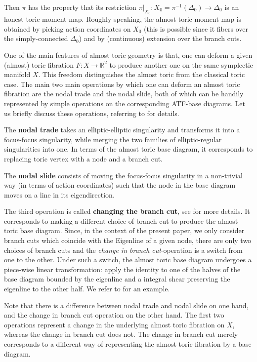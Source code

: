 \documentclass[12pt,a4paper,draft]{scrartcl}
\begin{document}
Then $\pi$ has the property that its restriction $\pi\vert_{X_0} \colon X_0 = \pi^{-1}(\Delta_0) \rightarrow \Delta_0$ is an honest toric moment map.
Roughly speaking, the almost toric moment map is obtained by picking action coordinates on $X_0$ (this is possible since it fibers over the simply-connected $\Delta_0$) and by (continuous) extension over the branch cuts.

One of the main features of almost toric geometry is that, one can deform a given (almost) toric fibration $F \colon X \rightarrow \mathbb{R}^2$ to produce another one on the same symplectic manifold $X$. This freedom distinguishes the almost toric from the classical toric case.
The main two main operations by which one can deform an almost toric fibration are the nodal trade and the nodal slide, both of which can be handily represented by simple operations on the corresponding ATF-base diagrams.
Let us briefly discuss these operations, referring to \cite[Sections 8.2-8.3]{evans2021atfs} for details.

The \textbf{nodal trade} takes an elliptic-elliptic singularity and transforms it into a focus-focus singularity, while merging the two families of elliptic-regular singularities into one.
In terms of the almost toric base diagram, it corresponds to replacing toric vertex with a node and a branch cut.

The \textbf{nodal slide} consists of moving the focus-focus singularity in a non-trivial way (in terms of action coordinates) such that the node in the base diagram moves on a line in its eigendirection.

The third operation is called \textbf{changing the branch cut}, see \cite[Sections 8.4]{evans2021atfs} for more details.
It corresponds to making a different choice of branch cut to produce the almost toric base diagram.
Since, in the context of the present paper, we only consider branch cuts which coincide with the Eigenline of a given node, there are only two choices of branch cuts and the \textit{change in branch cut}-operation is a switch from one to the other.
Under such a switch, the almost toric base diagram undergoes a piece-wise linear transformation: apply the identity to one of the halves of the base diagram bounded by the eigenline and a integral shear preserving the eigenline to the other half.
We refer to \cite[Example 8.15]{evans2021atfs} for an example.

Note that there is a difference between nodal trade and nodal slide on one hand, and the change in branch cut operation on the other hand.
The first two operations represent a change in the underlying almost toric fibration on $X$, whereas the change in branch cut does not.
The change in branch cut merely corresponds to a different way of representing the almost toric fibration by a base diagram.
\end{document}
